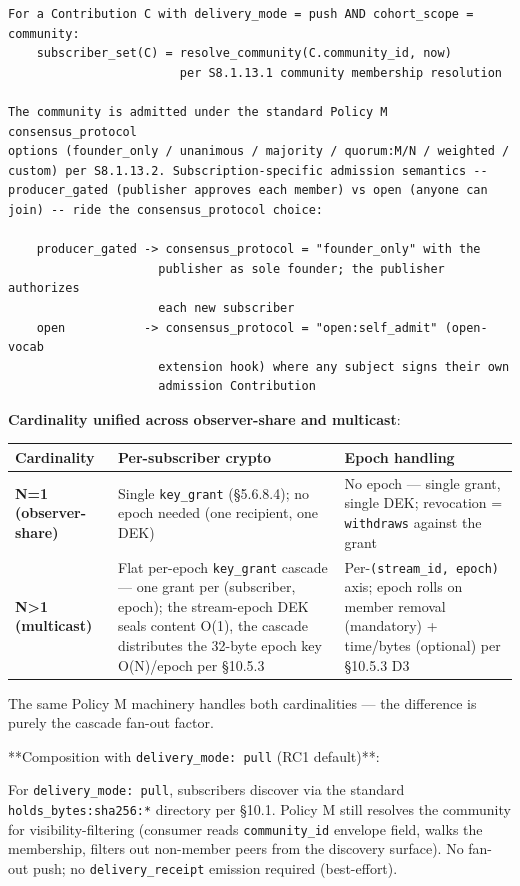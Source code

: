 \documentclass[10pt]{article}
\begin{document}
\begin{lstlisting}
For a Contribution C with delivery_mode = push AND cohort_scope = community:
    subscriber_set(C) = resolve_community(C.community_id, now)
                        per S8.1.13.1 community membership resolution

The community is admitted under the standard Policy M consensus_protocol
options (founder_only / unanimous / majority / quorum:M/N / weighted /
custom) per S8.1.13.2. Subscription-specific admission semantics --
producer_gated (publisher approves each member) vs open (anyone can
join) -- ride the consensus_protocol choice:

    producer_gated -> consensus_protocol = "founder_only" with the
                     publisher as sole founder; the publisher authorizes
                     each new subscriber
    open           -> consensus_protocol = "open:self_admit" (open-vocab
                     extension hook) where any subject signs their own
                     admission Contribution
\end{lstlisting}

\textbf{Cardinality unified across observer-share and multicast}:


{\footnotesize
\begin{longtable}{|p{5.33cm}|p{5.33cm}|p{5.33cm}|}\hline
\textbf{Cardinality} & \textbf{Per-subscriber crypto} & \textbf{Epoch handling} \\ \hline\endhead
\textbf{N=1 (observer-share)} & Single \texttt{key\_grant} (§5.6.8.4); no epoch needed (one recipient, one DEK) & No epoch — single grant, single DEK; revocation = \texttt{withdraws} against the grant \\ \hline
\textbf{N>1 (multicast)} & Flat per-epoch \texttt{key\_grant} cascade — one grant per (subscriber, epoch); the stream-epoch DEK seals content O(1), the cascade distributes the 32-byte epoch key O(N)/epoch per §10.5.3 & Per-\texttt{(stream\_id, epoch)} axis; epoch rolls on member removal (mandatory) + time/bytes (optional) per §10.5.3 D3 \\ \hline
\end{longtable}}


The same Policy M machinery handles both cardinalities — the difference is purely the cascade fan-out factor.


**Composition with \texttt{delivery\_mode: pull} (RC1 default)**:


For \texttt{delivery\_mode: pull}, subscribers discover via the standard \texttt{holds\_bytes:sha256:*} directory per §10.1. Policy M still resolves the community for visibility-filtering (consumer reads \texttt{community\_id} envelope field, walks the membership, filters out non-member peers from the discovery surface). No fan-out push; no \texttt{delivery\_receipt} emission required (best-effort).
\end{document}
